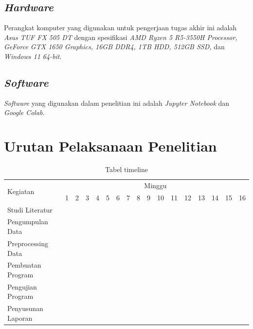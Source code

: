\subsection{\emph{Hardware}}
Perangkat komputer yang digunakan untuk pengerjaan tugas akhir ini adalah \emph{Asus TUF FX 505 DT} dengan spesifikasi \emph{AMD Ryzen 5 R5-3550H Processor, GeForce GTX 1650 Graphics, 16GB DDR4, 1TB HDD, 512GB SSD,} dan \emph{Windows 11 64-bit}.
\subsection{\emph{Software}}
\emph{Software} yang digunakan dalam penelitian ini adalah \emph{Jupyter Notebook} dan \emph{Google Colab}.

\section{Urutan Pelaksanaan Penelitian}

\newcommand{\w}{}
\newcommand{\G}{\cellcolor{gray}}
\begin{table}[h!]
  \caption{Tabel timeline}
  \label{tb:timeline}
  \begin{tabular}{|p{3.5cm}|c|c|c|c|c|c|c|c|c|c|c|c|c|c|c|c|}

    \hline
    \multirow{2}{*}{Kegiatan} & \multicolumn{16}{|c|}{Minggu} \\
    \cline{2-17} &
    1 & 2 & 3 & 4 & 5 & 6 & 7 & 8 & 9 & 10 & 11 & 12 & 13 & 14 & 15 & 16 \\
    \hline

    Studi Literatur &
    \G & \G & \w & \w & \w & \w & \w & \w & \w & \w & \w & \w & \w & \w & \w & \w \\
    \hline

    Pengumpulan Data &
    \w & \G & \G & \w & \w & \w & \w & \w & \w & \w & \w & \w & \w & \w & \w & \w \\
    \hline

    Preprocessing Data &
    \w & \w & \G & \G & \G & \w & \w & \w & \w & \w & \w & \w & \w & \w & \w & \w \\
    \hline

    Pembuatan Program &
    \w & \w & \w & \w & \G & \G & \G & \G & \G & \G & \G & \G & \w & \w & \w & \w \\
    \hline

    Pengujian Program &
    \w & \w & \w & \w & \w & \w & \w & \w & \w & \w & \w & \G & \G & \G & \w & \w \\
    \hline

    Penyusunan \linebreak Laporan &
    \G & \G & \G & \G & \G & \G & \G & \G & \G & \G & \G & \G & \G & \G & \G & \G \\
    \hline

  \end{tabular}
\end{table}


